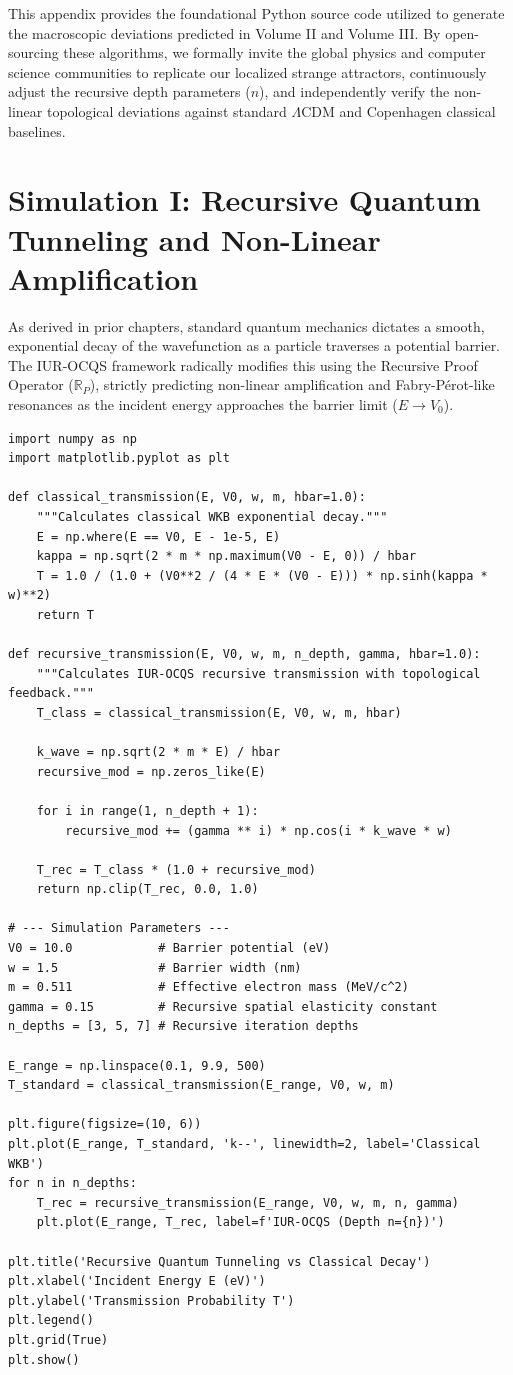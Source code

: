 \documentclass[12pt,openany]{book}
\begin{document}
This appendix provides the foundational Python source code utilized to generate the macroscopic deviations predicted in Volume II and Volume III. By open-sourcing these algorithms, we formally invite the global physics and computer science communities to replicate our localized strange attractors, continuously adjust the recursive depth parameters ($n$), and independently verify the non-linear topological deviations against standard $\Lambda$CDM and Copenhagen classical baselines.

\section{Simulation I: Recursive Quantum Tunneling and Non-Linear Amplification}
As derived in prior chapters, standard quantum mechanics dictates a smooth, exponential decay of the wavefunction as a particle traverses a potential barrier. The IUR-OCQS framework radically modifies this using the Recursive Proof Operator ($\mathbb{R}_P$), strictly predicting non-linear amplification and Fabry-P\'{e}rot-like resonances as the incident energy approaches the barrier limit ($E \to V_0$).

\begin{verbatim}
import numpy as np
import matplotlib.pyplot as plt

def classical_transmission(E, V0, w, m, hbar=1.0):
    """Calculates classical WKB exponential decay."""
    E = np.where(E == V0, E - 1e-5, E) 
    kappa = np.sqrt(2 * m * np.maximum(V0 - E, 0)) / hbar
    T = 1.0 / (1.0 + (V0**2 / (4 * E * (V0 - E))) * np.sinh(kappa * w)**2)
    return T

def recursive_transmission(E, V0, w, m, n_depth, gamma, hbar=1.0):
    """Calculates IUR-OCQS recursive transmission with topological feedback."""
    T_class = classical_transmission(E, V0, w, m, hbar)
    
    k_wave = np.sqrt(2 * m * E) / hbar
    recursive_mod = np.zeros_like(E)
    
    for i in range(1, n_depth + 1):
        recursive_mod += (gamma ** i) * np.cos(i * k_wave * w)
        
    T_rec = T_class * (1.0 + recursive_mod)
    return np.clip(T_rec, 0.0, 1.0)

# --- Simulation Parameters ---
V0 = 10.0            # Barrier potential (eV)
w = 1.5              # Barrier width (nm)
m = 0.511            # Effective electron mass (MeV/c^2)
gamma = 0.15         # Recursive spatial elasticity constant
n_depths = [3, 5, 7] # Recursive iteration depths

E_range = np.linspace(0.1, 9.9, 500)
T_standard = classical_transmission(E_range, V0, w, m)

plt.figure(figsize=(10, 6))
plt.plot(E_range, T_standard, 'k--', linewidth=2, label='Classical WKB')
for n in n_depths:
    T_rec = recursive_transmission(E_range, V0, w, m, n, gamma)
    plt.plot(E_range, T_rec, label=f'IUR-OCQS (Depth n={n})')

plt.title('Recursive Quantum Tunneling vs Classical Decay')
plt.xlabel('Incident Energy E (eV)')
plt.ylabel('Transmission Probability T')
plt.legend()
plt.grid(True)
plt.show()
\end{verbatim}
\end{document}
